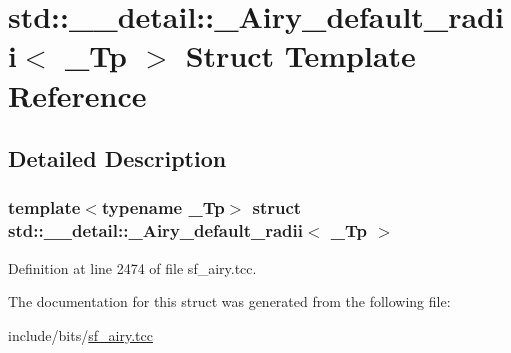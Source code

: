 \hypertarget{structstd_1_1____detail_1_1__Airy__default__radii}{}\section{std\+:\+:\+\_\+\+\_\+detail\+:\+:\+\_\+\+Airy\+\_\+default\+\_\+radii$<$ \+\_\+\+Tp $>$ Struct Template Reference}
\label{structstd_1_1____detail_1_1__Airy__default__radii}


\subsection{Detailed Description}
\subsubsection*{template$<$typename \+\_\+\+Tp$>$\newline
struct std\+::\+\_\+\+\_\+detail\+::\+\_\+\+Airy\+\_\+default\+\_\+radii$<$ \+\_\+\+Tp $>$}



Definition at line 2474 of file sf\+\_\+airy.\+tcc.



The documentation for this struct was generated from the following file\+:\begin{DoxyCompactItemize}
\item 
include/bits/\hyperlink{sf__airy_8tcc}{sf\+\_\+airy.\+tcc}\end{DoxyCompactItemize}
